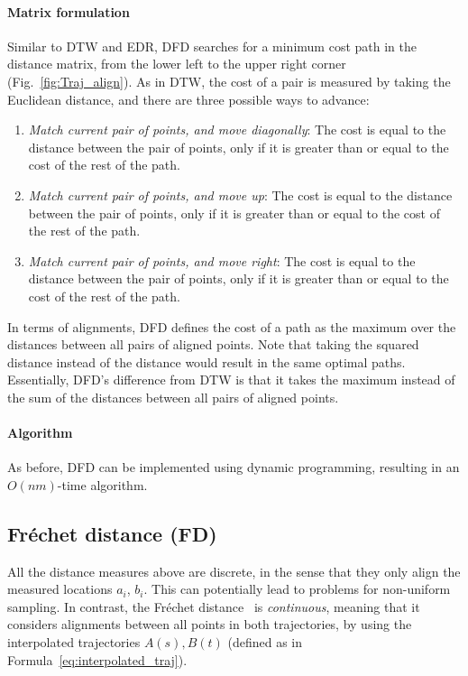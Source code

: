 \documentclass[10pt,letterpaper]{article}
\begin{document}
\paragraph{Matrix formulation}
Similar to DTW and EDR, DFD searches for a minimum cost path in the distance matrix, from the lower left to the upper right corner (Fig.~\ref{fig:Traj_align}). As in DTW, the cost of a pair is measured by taking the Euclidean distance, and there are three possible ways to advance:

\begin{enumerate}
\item \textit{Match current pair of points, and move diagonally}: The cost is equal to the distance between the pair of points, only if it is greater than or equal to the cost of the rest of the path.
\item \textit{Match current pair of points, and move up}: The cost is equal to the distance between the pair of points, only if it is greater than or equal to the cost of the rest of the path.
\item \textit{Match current pair of points, and move right}: The cost is equal to the distance between the pair of points, only if it is greater than or equal to the cost of the rest of the path.
\end{enumerate}

In terms of alignments, DFD defines the cost of a path as the maximum over the distances between all pairs of aligned points. Note that taking the squared distance instead of the distance would result in the same optimal paths. Essentially, DFD's difference from DTW is that it takes the maximum instead of the sum of the distances between all pairs of aligned points.

\paragraph{Algorithm} As before, DFD can be implemented using dynamic programming, resulting in an $O(nm)$-time algorithm.


\subsection{Fr\'echet distance (FD)}
All the distance measures above are discrete, in the sense that they only align the measured locations $a_i$, $b_i$. This can potentially lead to problems for non-uniform sampling.
In contrast, the Fr\'echet distance~\cite{ag-cfd-95} is \emph{continuous}, meaning that it considers alignments between all points in both trajectories, by using the interpolated trajectories $A(s), B(t)$ (defined as in Formula~\ref{eq:interpolated_traj}).
\end{document}
